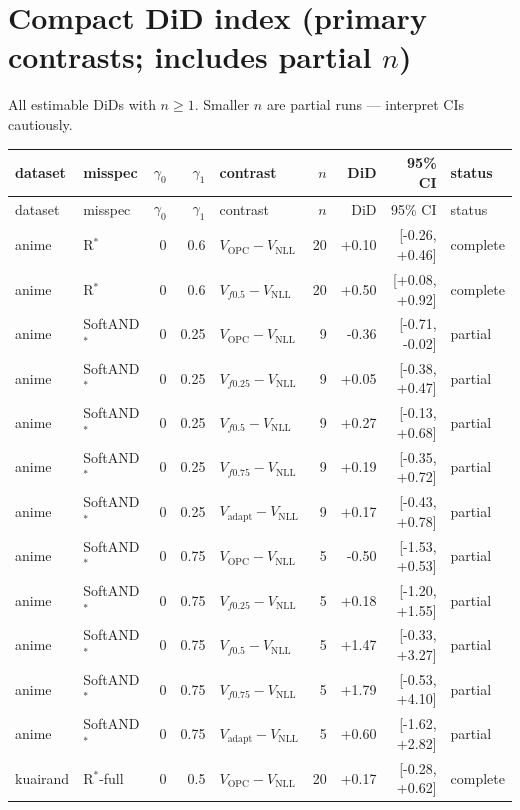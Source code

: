 \documentclass[10pt,a4paper]{article}
\begin{document}
\section{Compact DiD index (primary contrasts; includes partial $n$)}
All estimable DiDs with $n\ge 1$. Smaller $n$ are partial runs --- interpret CIs cautiously.
{\footnotesize\begin{longtable}{llrrlrrrl}
\toprule dataset & misspec & $\gamma_0$ & $\gamma_1$ & contrast & $n$ & DiD & 95\% CI & status \\
\midrule\endfirsthead
\toprule dataset & misspec & $\gamma_0$ & $\gamma_1$ & contrast & $n$ & DiD & 95\% CI & status \\
\midrule\endhead\bottomrule\endfoot
anime & R$^*$ & 0 & 0.6 & $V_{\mathrm{OPC}}-V_{\mathrm{NLL}}$ & 20 & +0.10 & [-0.26, +0.46] & complete \\
anime & R$^*$ & 0 & 0.6 & $V_{f0.5}-V_{\mathrm{NLL}}$ & 20 & +0.50 & [+0.08, +0.92] & complete \\
anime & SoftAND$^*$ & 0 & 0.25 & $V_{\mathrm{OPC}}-V_{\mathrm{NLL}}$ & 9 & -0.36 & [-0.71, -0.02] & partial \\
anime & SoftAND$^*$ & 0 & 0.25 & $V_{f0.25}-V_{\mathrm{NLL}}$ & 9 & +0.05 & [-0.38, +0.47] & partial \\
anime & SoftAND$^*$ & 0 & 0.25 & $V_{f0.5}-V_{\mathrm{NLL}}$ & 9 & +0.27 & [-0.13, +0.68] & partial \\
anime & SoftAND$^*$ & 0 & 0.25 & $V_{f0.75}-V_{\mathrm{NLL}}$ & 9 & +0.19 & [-0.35, +0.72] & partial \\
anime & SoftAND$^*$ & 0 & 0.25 & $V_{\mathrm{adapt}}-V_{\mathrm{NLL}}$ & 9 & +0.17 & [-0.43, +0.78] & partial \\
anime & SoftAND$^*$ & 0 & 0.75 & $V_{\mathrm{OPC}}-V_{\mathrm{NLL}}$ & 5 & -0.50 & [-1.53, +0.53] & partial \\
anime & SoftAND$^*$ & 0 & 0.75 & $V_{f0.25}-V_{\mathrm{NLL}}$ & 5 & +0.18 & [-1.20, +1.55] & partial \\
anime & SoftAND$^*$ & 0 & 0.75 & $V_{f0.5}-V_{\mathrm{NLL}}$ & 5 & +1.47 & [-0.33, +3.27] & partial \\
anime & SoftAND$^*$ & 0 & 0.75 & $V_{f0.75}-V_{\mathrm{NLL}}$ & 5 & +1.79 & [-0.53, +4.10] & partial \\
anime & SoftAND$^*$ & 0 & 0.75 & $V_{\mathrm{adapt}}-V_{\mathrm{NLL}}$ & 5 & +0.60 & [-1.62, +2.82] & partial \\
kuairand & R$^*$-full & 0 & 0.5 & $V_{\mathrm{OPC}}-V_{\mathrm{NLL}}$ & 20 & +0.17 & [-0.28, +0.62] & complete \\

\end{longtable}}
\end{document}
